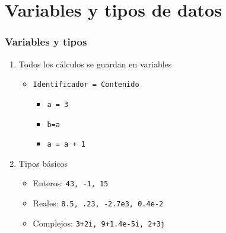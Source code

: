 \section{Variables y tipos de datos}
\begin{frame}[label=variables]
 \frametitle{Variables y tipos}
 \begin{enumerate}
  \item Todos los cálculos se guardan en variables
  \begin{itemize}
   \item \texttt{Identificador = Contenido}
   \begin{itemize}
    \item \texttt{a = 3}
    \item \texttt{b=a}
    \item \texttt{a = a + 1}
   \end{itemize}
  \end{itemize}
  \item Tipos básicos
  \begin{itemize}
   \item Enteros: \texttt{43, -1, 15}
   \item Reales: \texttt{8.5, .23, -2.7e3, 0.4e-2}
   \item Complejos: \texttt{3+2i, 9+1.4e-5i, 2+3j}
  \end{itemize}
 \end{enumerate}
\end{frame}
